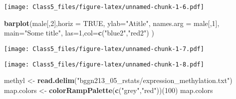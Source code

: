 \documentclass[]{article}
\newenvironment{Shaded}{\begin{snugshade}}{\end{snugshade}}
\newcommand{\KeywordTok}[1]{\textcolor[rgb]{0.13,0.29,0.53}{\textbf{#1}}}
\newcommand{\DataTypeTok}[1]{\textcolor[rgb]{0.13,0.29,0.53}{#1}}
\newcommand{\DecValTok}[1]{\textcolor[rgb]{0.00,0.00,0.81}{#1}}
\newcommand{\StringTok}[1]{\textcolor[rgb]{0.31,0.60,0.02}{#1}}
\newcommand{\OtherTok}[1]{\textcolor[rgb]{0.56,0.35,0.01}{#1}}
\newcommand{\OperatorTok}[1]{\textcolor[rgb]{0.81,0.36,0.00}{\textbf{#1}}}
\newcommand{\NormalTok}[1]{#1}
\begin{document}
\texttt{[image: Class5\_files/figure-latex/unnamed-chunk-1-6.pdf]}

\begin{Shaded}
\begin{Highlighting}[]
\KeywordTok{barplot}\NormalTok{(male[,}\DecValTok{2}\NormalTok{],}\DataTypeTok{horiz =} \OtherTok{TRUE}\NormalTok{, }\DataTypeTok{ylab=}\StringTok{"Atitle"}\NormalTok{, }\DataTypeTok{names.arg =}\NormalTok{ male[,}\DecValTok{1}\NormalTok{], }\DataTypeTok{main=}\StringTok{"Some title"}\NormalTok{, }\DataTypeTok{las=}\DecValTok{1}\NormalTok{,}\DataTypeTok{col=}\KeywordTok{c}\NormalTok{(}\StringTok{"blue2"}\NormalTok{,}\StringTok{"red2"}\NormalTok{) )}
\end{Highlighting}
\end{Shaded}

\texttt{[image: Class5\_files/figure-latex/unnamed-chunk-1-7.pdf]}

\begin{Shaded}
\end{Shaded}

\texttt{[image: Class5\_files/figure-latex/unnamed-chunk-1-8.pdf]}

\begin{Shaded}
\begin{Highlighting}[]
\NormalTok{methyl <-}\StringTok{ }\KeywordTok{read.delim}\NormalTok{(}\StringTok{"bggn213_05_rstats/expression_methylation.txt"}\NormalTok{)}
\NormalTok{map.colors <-}\StringTok{ }\KeywordTok{colorRampPalette}\NormalTok{(}\KeywordTok{c}\NormalTok{(}\StringTok{"grey"}\NormalTok{,}\StringTok{"red"}\NormalTok{))(}\DecValTok{100}\NormalTok{)}
\NormalTok{map.colors}
\end{Highlighting}
\end{Shaded}
\end{document}
